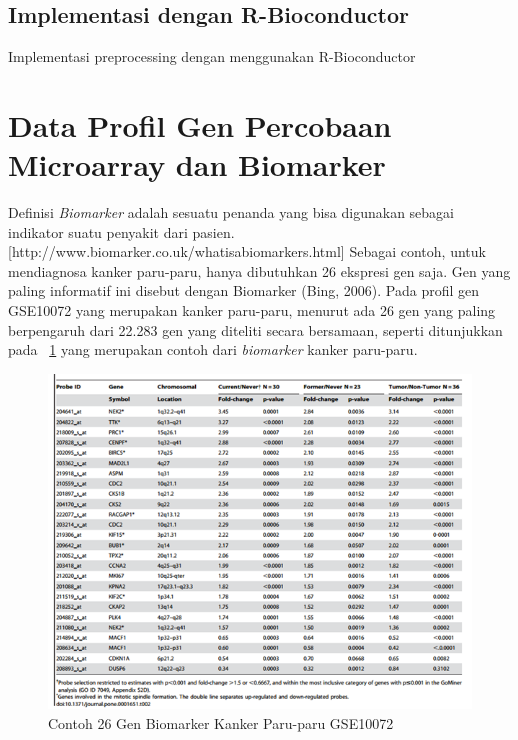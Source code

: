 \subsection{Implementasi dengan R-Bioconductor}
Implementasi preprocessing dengan menggunakan R-Bioconductor

% 


\section{Data Profil Gen Percobaan Microarray dan Biomarker}

Definisi \textit{Biomarker} adalah sesuatu penanda yang bisa digunakan sebagai indikator suatu penyakit dari pasien. [http://www.biomarker.co.uk/whatisabiomarkers.html] Sebagai contoh, untuk mendiagnosa kanker paru-paru, hanya dibutuhkan 26 ekspresi gen saja. Gen yang paling informatif ini disebut dengan Biomarker (Bing, 2006). Pada profil gen GSE10072 yang merupakan kanker paru-paru, menurut  \citep{belinsky2004gene} ada 26 gen yang paling berpengaruh dari 22.283 gen yang diteliti secara bersamaan, seperti ditunjukkan pada \pic~\ref{fig:biomarker} yang merupakan contoh dari \textit{biomarker} kanker paru-paru.

\begin{figure}
	\centering
	\includegraphics[width=1\textwidth]
		{pics/biomarker.png}
	\caption{Contoh 26 Gen Biomarker Kanker Paru-paru GSE10072}
	\label{fig:biomarker}
\end{figure}


